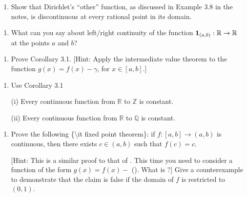 \documentclass[letterpaper,10pt,english]{jupyterBook}
\begin{document}
\label{\detokenize{Problems:id22}}\begin{enumerate}
%
\setcounter{enumi}{21}
\item {} 
\sphinxAtStartPar
Show that Dirichlet’s “other” function, as discussed in Example 3.8 in the notes, is discontinuous at every rational point in its domain.

\end{enumerate}
\label{\detokenize{Problems:id23}}\begin{enumerate}
%
\setcounter{enumi}{22}
\item {} 
\sphinxAtStartPar
What can you say about left/right continuity of the function  \({\bf 1}_{(a, b)}:\mathbb{R}\to\mathbb{R}\) at the points \(a\) and \(b\)?

\end{enumerate}
\label{\detokenize{Problems:id24}}\begin{enumerate}
%
\setcounter{enumi}{23}
\item {} 
\sphinxAtStartPar
Prove Corollary 3.1. {[}Hint: Apply the intermediate value theorem to the function \(g(x) = f(x) - \gamma\), for \(x \in [a, b]\).{]}

\end{enumerate}
\label{\detokenize{Problems:id25}}\begin{enumerate}
%
\setcounter{enumi}{24}
\item {} 
\sphinxAtStartPar
Use Corollary 3.1

\sphinxAtStartPar
(i) Every continuous function from \(\mathbb{R}\) to \(\mathbb{Z}\) is constant.

\sphinxAtStartPar
(ii) Every continuous function from \(\mathbb{R}\) to \(\mathbb{Q}\) is constant.

\end{enumerate}
\label{\detokenize{Problems:id26}}\begin{enumerate}
%
\setcounter{enumi}{25}
\item {} 
\sphinxAtStartPar
Prove the following \{\textbackslash{}it fixed point theorem\}: if \(f:[a,b] \rightarrow (a,b)\) is continuous, then there exists \(c \in (a, b)\) such that \(f(c) = c\).

{[}Hint: This is a similar proof to that of {\hyperref[\detokenize{Problems:id24}]{}}. This time you need to consider a function of the form \(g(x) = f(x) - \) (). What is ?{]} Give a counter\sphinxhyphen{}example to demonstrate that the claim is false if the domain of \(f\) is restricted to \((0, 1)\).

\end{enumerate}
\end{document}
